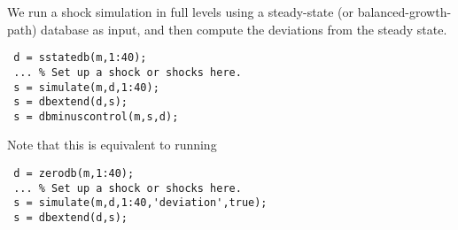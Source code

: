  We run a shock simulation in full levels using a steady-state (or
 balanced-growth-path) database as input, and then compute the deviations
 from the steady state.
 
 \begin{verbatim}
 d = sstatedb(m,1:40);
 ... % Set up a shock or shocks here.
 s = simulate(m,d,1:40);
 s = dbextend(d,s);
 s = dbminuscontrol(m,s,d);
 \end{verbatim}
 
 Note that this is equivalent to running
 
 \begin{verbatim}
 d = zerodb(m,1:40);
 ... % Set up a shock or shocks here.
 s = simulate(m,d,1:40,'deviation',true);
 s = dbextend(d,s);
 \end{verbatim}


